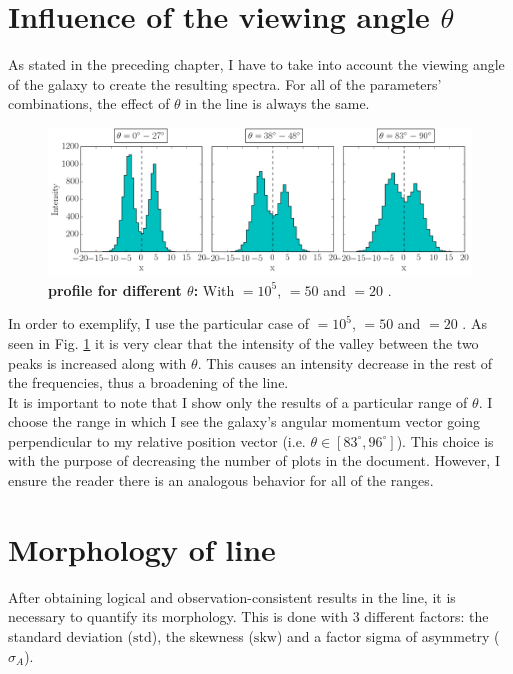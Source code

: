 \section{Influence of the viewing angle $\theta$}
As stated in the preceding chapter, I have to take into account the viewing angle of the galaxy to create the resulting spectra. For all of the parameters' combinations, the effect of $\theta$ in the \lya line is always the same.\\

\begin{figure}[h!]
	\begin{center}
		\includegraphics[width=1\textwidth]{./figures/chapter3/influence_viewing_angle2}
	\end{center}
	\caption{\textbf{\lya profile for different $\theta$:} With \tauh$=10^5$, \vrot$=50$ \kms and \vout$=20$ \kms.
		\label{fig:influence_viewing_angle}}
\end{figure}

In order to exemplify, I use the particular case of \tauh$=10^5$, \vrot$=50$ \kms and \vout$=20$ \kms. As seen in Fig. \ref{fig:influence_viewing_angle} it is very clear that the intensity of the valley between the two peaks is increased along with $\theta$. This causes an intensity decrease in the rest of the frequencies, thus a broadening of the line. \\

It is important to note that I show only the results of a particular range of $\theta$. I choose the range in which I see the galaxy's angular momentum vector going perpendicular to my relative position vector (i.e. $\theta \in [83^\circ,96^\circ]$). This choice is with the purpose of decreasing the number of plots in the document. However, I ensure the reader there is an analogous behavior for all of the ranges. \\

\section{Morphology of \lya line}
After obtaining logical and observation-consistent results in the \lya line, it is necessary to quantify its morphology. This is done with 3 different factors: the standard deviation ($\mathrm{std}$), the skewness ($\mathrm{skw}$) and a factor sigma of asymmetry ($\sigma_A$). \\

